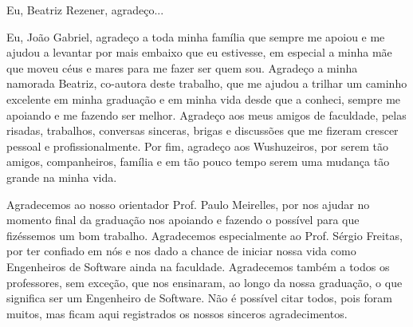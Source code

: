 \begin{agradecimentos}

Eu, Beatriz Rezener, agradeço...

Eu, João Gabriel, agradeço a toda minha família que sempre me apoiou e me ajudou a levantar por mais embaixo que eu estivesse, em especial a minha mãe que moveu céus e mares para me fazer ser quem sou.
Agradeço a minha namorada Beatriz, co-autora deste trabalho, que me ajudou a trilhar um caminho excelente em minha graduação e em minha vida desde que a conheci, sempre me apoiando e me fazendo ser melhor.
Agradeço aos meus amigos de faculdade, pelas risadas, trabalhos, conversas sinceras, brigas e discussões que me fizeram crescer pessoal e profissionalmente.
Por fim, agradeço aos Wushuzeiros, por serem tão amigos, companheiros, família e em tão pouco tempo serem uma mudança tão grande na minha vida.

Agradecemos ao nosso orientador Prof. Paulo Meirelles, por nos ajudar no momento final da graduação nos apoiando e fazendo o possível para que fizéssemos um bom trabalho.
Agradecemos especialmente ao Prof. Sérgio Freitas, por ter confiado em nós e nos dado a chance de iniciar nossa vida como Engenheiros de Software ainda na faculdade.
Agradecemos também a todos os professores, sem exceção, que nos ensinaram, ao longo da nossa graduação, o que significa ser um Engenheiro de Software. Não é possível citar todos, 
pois foram muitos, mas ficam aqui registrados os nossos sinceros agradecimentos.

\end{agradecimentos}
